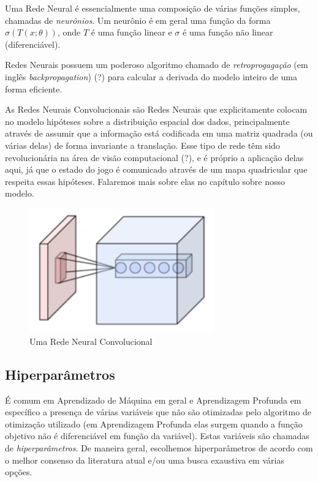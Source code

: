 Uma Rede Neural é essencialmente uma composição de várias funções simples, chamadas de \textit{neurônios}. Um neurônio é em geral uma função da forma $\sigma(T(x; \theta))$, onde $T$ é uma função linear e $\sigma$ é uma função não linear (diferenciável).

Redes Neurais possuem um poderoso algoritmo chamado de \textit{retroprogagação} (em inglês \textit{backpropagation}) (?) para calcular a derivada do modelo inteiro de uma forma eficiente.

As Redes Neurais Convolucionais são Redes Neurais que explicitamente colocam no modelo hipóteses sobre a distribuição espacial dos dados, principalmente através de assumir que a informação está codificada em uma matriz quadrada (ou várias delas) de forma invariante a translação. Esse tipo de rede têm sido revolucionária na área de visão computacional (?), e é próprio a aplicação delas aqui, já que o estado do jogo é comunicado através de um mapa quadricular que respeita essas hipóteses. Falaremos mais sobre elas no capítulo sobre nosso modelo.

\begin{figure}[h!]
\centering
    \includegraphics[width=8cm]{figuras/Conv_layer.png}
    \caption{Uma Rede Neural Convolucional}
    \label{fig:conv_layer}
\end{figure}

\subsection{Hiperparâmetros}

É comum em Aprendizado de Máquina em geral e Aprendizagem Profunda em específico a presença de várias variáveis que não são otimizadas pelo algoritmo de otimização utilizado (em Aprendizagem Profunda elas surgem quando a função objetivo não é diferenciável em função da variável). Estas variáveis são chamadas de \textit{hiperparâmetros}. De maneira geral, escolhemos hiperparâmetros de acordo com o melhor consenso da literatura atual e/ou uma busca exaustiva em várias opções.

